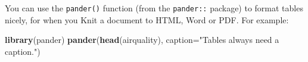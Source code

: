 \documentclass[]{article}
\newenvironment{Shaded}{\begin{snugshade}}{\end{snugshade}}
\newcommand{\DataTypeTok}[1]{\textcolor[rgb]{0.13,0.29,0.53}{#1}}
\newcommand{\DecValTok}[1]{\textcolor[rgb]{0.00,0.00,0.81}{#1}}
\newcommand{\KeywordTok}[1]{\textcolor[rgb]{0.13,0.29,0.53}{\textbf{#1}}}
\newcommand{\NormalTok}[1]{#1}
\newcommand{\OperatorTok}[1]{\textcolor[rgb]{0.81,0.36,0.00}{\textbf{#1}}}
\newcommand{\StringTok}[1]{\textcolor[rgb]{0.31,0.60,0.02}{#1}}
\begin{document}
\begin{Shaded}
\end{Shaded}

You can use the \texttt{pander()} function (from the \texttt{pander::} package) to format
tables nicely, for when you Knit a document to HTML, Word or PDF. For example:

\begin{Shaded}
\begin{Highlighting}[]
\KeywordTok{library}\NormalTok{(pander)}
\KeywordTok{pander}\NormalTok{(}\KeywordTok{head}\NormalTok{(airquality), }\DataTypeTok{caption=}\StringTok{"Tables always need a caption."}\NormalTok{)}
\end{Highlighting}
\end{Shaded}
\end{document}
